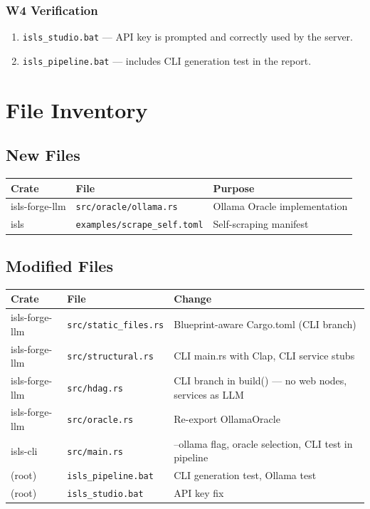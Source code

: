 \documentclass[11pt,a4paper]{article}
\begin{document}
\subsubsection{W4 Verification}

\begin{enumerate}[nosep]
\item \texttt{isls\_studio.bat} --- API key is prompted and 
      correctly used by the server.
\item \texttt{isls\_pipeline.bat} --- includes CLI generation 
      test in the report.
\end{enumerate}


\section{File Inventory}

\subsection{New Files}

\begin{longtable}{llp{7cm}}
\toprule
\textbf{Crate} & \textbf{File} & \textbf{Purpose} \\
\midrule
isls-forge-llm & \texttt{src/oracle/ollama.rs}
  & Ollama Oracle implementation \\
isls & \texttt{examples/scrape\_self.toml}
  & Self-scraping manifest \\
\bottomrule
\end{longtable}

\subsection{Modified Files}

\begin{longtable}{llp{7cm}}
\toprule
\textbf{Crate} & \textbf{File} & \textbf{Change} \\
\midrule
isls-forge-llm & \texttt{src/static\_files.rs}
  & Blueprint-aware Cargo.toml (CLI branch) \\
isls-forge-llm & \texttt{src/structural.rs}
  & CLI main.rs with Clap, CLI service stubs \\
isls-forge-llm & \texttt{src/hdag.rs}
  & CLI branch in build() --- no web nodes, services as LLM \\
isls-forge-llm & \texttt{src/oracle.rs}
  & Re-export OllamaOracle \\
isls-cli & \texttt{src/main.rs}
  & --ollama flag, oracle selection, CLI test in pipeline \\
(root) & \texttt{isls\_pipeline.bat}
  & CLI generation test, Ollama test \\
(root) & \texttt{isls\_studio.bat}
  & API key fix \\
\bottomrule
\end{longtable}
\end{document}
